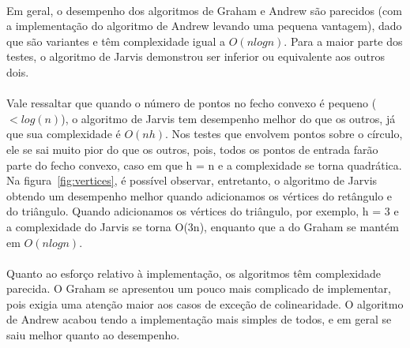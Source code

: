 \documentclass[11pt,a4paper]{article}
\begin{document}
    \paragraph{}
    Em geral, o desempenho dos algoritmos de Graham e Andrew são parecidos (com a implementação do algoritmo de Andrew levando uma pequena vantagem), dado que são variantes e têm complexidade igual a $O(nlogn)$. Para a maior parte dos testes, o algoritmo de Jarvis demonstrou ser inferior ou equivalente aos outros dois.
    
    \paragraph{}
    Vale ressaltar que quando o número de pontos no fecho convexo é pequeno ($< log(n)$), o algoritmo de Jarvis tem desempenho melhor do que os outros, já que sua complexidade é $O(nh)$. Nos testes que envolvem pontos sobre o círculo, ele se sai muito pior do que os outros, pois, todos os pontos de entrada farão parte do fecho convexo, caso em que h = n e a complexidade se torna quadrática. Na figura~\ref{fig:vertices}, é possível observar, entretanto, o algoritmo de Jarvis obtendo um desempenho melhor quando adicionamos os vértices do retângulo e do triângulo. Quando adicionamos os vértices do triângulo, por exemplo, h = 3 e a complexidade do Jarvis se torna O(3n), enquanto que a do Graham se mantém em $O(nlogn)$.

    \paragraph{}
    Quanto ao esforço relativo à implementação, os algoritmos têm complexidade parecida. O Graham se apresentou um pouco mais complicado de implementar, pois exigia uma atenção maior aos casos de exceção de colinearidade. O algoritmo de Andrew acabou tendo a implementação mais simples de todos, e em geral se saiu melhor quanto ao desempenho.
\end{document}
